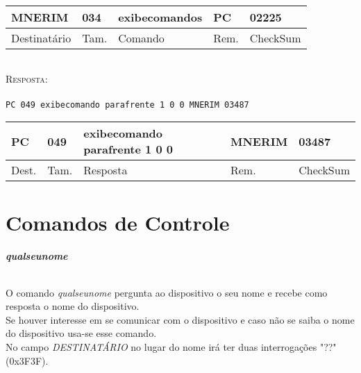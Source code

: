 \documentclass[11pt,	 papera4]{article}
\begin{document}
\begin{table}[h]
	\centering
	\begin{tabular}{p{2cm}p{1cm}p{3cm}p{1cm}p{2cm}}
		\toprule
		MNERIM & 034 & exibecomandos & PC & 02225 \\
		\midrule	
		Destinatário & Tam. & Comando & Rem. &CheckSum \\
		\bottomrule
	\end{tabular}
	\label{tab:formatoslatex} %
\end{table}
\paragraph*{\newline\newline}
\hspace*{0.8cm}\textsc{Resposta:} \\\\ \hspace*{2cm}\texttt{PC 049 exibecomando parafrente 1 0 0 MNERIM 03487} 

\begin{table}[h]
	\centering
	\begin{tabular}{p{1cm}p{1cm}p{3cm}p{2cm}p{2cm}}
		\toprule
		PC & 049 & exibecomando parafrente 1 0 0  & MNERIM & 03487 \\
		\midrule	
		Dest. & Tam. & Resposta  & Rem. & CheckSum \\
		\bottomrule
	\end{tabular}
	\label{tab:formatoslatex} %
\end{table}

\newpage

\part*{Comandos de Controle \newline}
	

\paragraph{\textbf{qualseunome} \newline \newline}
O comando \textit{qualseunome} pergunta ao dispositivo o seu nome e recebe como resposta o nome do dispositivo. \\
Se houver interesse em se comunicar com o dispositivo e
caso não se saiba o nome do dispositivo usa-se esse comando. \\
No campo \textit{DESTINATÁRIO} no lugar do nome irá ter duas interrogações "??" (0x3F3F).
\\
\end{document}
